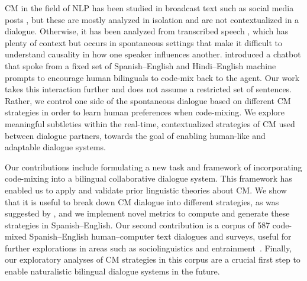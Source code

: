 \documentclass[11pt,a4paper]{article}
\begin{document}
CM in the field of NLP has been studied in broadcast text such as social media posts \citep{Rijhwani2017,aguilar2018named}, but these are mostly analyzed in isolation and are not contextualized in a dialogue. 
Otherwise, it has been analyzed from transcribed speech \citep{lyu2010,LI2014,deuchar2014building}, which has plenty of context but occurs in spontaneous settings that make it difficult to understand causality in how one speaker influences another.
\citet{ramanarayanan2017jee} introduced a chatbot that spoke from a fixed set of Spanish--English and Hindi--English machine prompts to encourage human bilinguals to code-mix back to the agent. 
Our work takes this interaction further and does not assume a restricted set of sentences.
Rather, we control one side of the spontaneous dialogue based on different CM strategies in order to learn human preferences when code-mixing.
We explore meaningful subtleties within the real-time, contextualized strategies of CM used between dialogue partners, towards the goal of enabling human-like and adaptable dialogue systems.

Our contributions include formulating a new task and framework of incorporating code-mixing into a bilingual collaborative dialogue system.
This framework has enabled us to apply and validate prior linguistic theories about CM.
We show that it is useful to break down CM dialogue into different strategies, as was suggested by \citet{bullock2018should}, and we implement novel metrics to compute and generate these strategies in Spanish--English.
Our second contribution is a corpus of 587 code-mixed Spanish--English human--computer text dialogues and surveys, useful for further explorations in areas such as sociolinguistics and entrainment~\citep[cf.][]{danescu2011mark}. 
Finally, our exploratory analyses of CM strategies in this corpus are a crucial first step to enable naturalistic bilingual dialogue systems in the future. %
\end{document}
